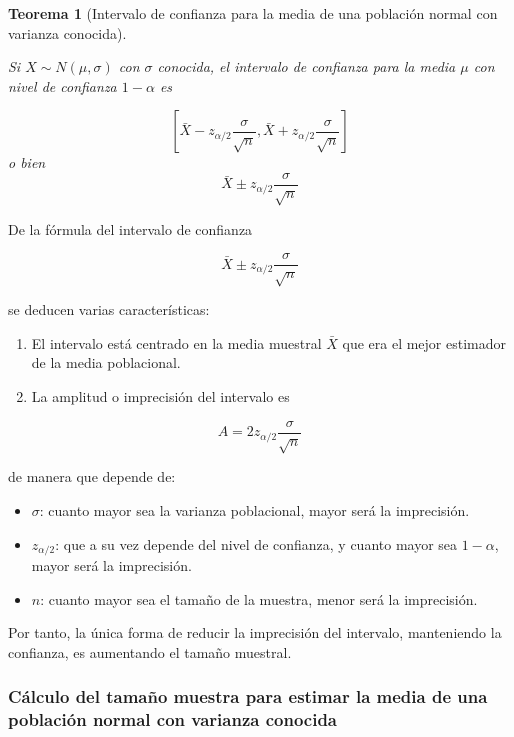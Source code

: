 \documentclass[
  a4paper,
]{scrreport}
\providecommand{\tightlist}{%
  \setlength{\itemsep}{0pt}\setlength{\parskip}{0pt}}\usepackage{longtable,booktabs,array}
\theoremstyle{plain}
\newtheorem{theorem}{Teorema}[chapter]
\theoremstyle{definition}
\theoremstyle{definition}
\theoremstyle{remark}
\begin{document}
\begin{theorem}[Intervalo de confianza para la media de una población
normal con varianza
conocida]\protect\hypertarget{thm-intervalo-confianza-media-normal-varianza-conocida}{}\label{thm-intervalo-confianza-media-normal-varianza-conocida}

Si \(X\sim N(\mu, \sigma)\) con \(\sigma\) conocida, el \emph{intervalo
de confianza para la media} \(\mu\) con nivel de confianza \(1-\alpha\)
es

\[
\left[\bar{X}-z_{\alpha/2}\frac{\sigma}{\sqrt{n}},\bar{X}+z_{\alpha/2}\frac{\sigma}{\sqrt{n}}\right]
\] o bien \[
\bar{X}\pm z_{\alpha/2}\frac{\sigma}{\sqrt{n}}
\]

\end{theorem}

De la fórmula del intervalo de confianza

\[
\bar{X}\pm z_{\alpha/2}\frac{\sigma}{\sqrt{n}}
\]

se deducen varias características:

\begin{enumerate}
\def\labelenumi{\alph{enumi}.}
\item
  El intervalo está centrado en la media muestral \(\bar X\) que era el
  mejor estimador de la media poblacional.
\item
  La amplitud o imprecisión del intervalo es
\end{enumerate}

\[
A= 2 z_{\alpha/2}\frac{\sigma}{\sqrt{n}}
\]

de manera que depende de:

\begin{itemize}
\tightlist
\item
  \(\sigma\): cuanto mayor sea la varianza poblacional, mayor será la
  imprecisión.
\item
  \(z_{\alpha/2}\): que a su vez depende del nivel de confianza, y
  cuanto mayor sea \(1-\alpha\), mayor será la imprecisión.
\item
  \(n\): cuanto mayor sea el tamaño de la muestra, menor será la
  imprecisión.
\end{itemize}

Por tanto, la única forma de reducir la imprecisión del intervalo,
manteniendo la confianza, es aumentando el tamaño muestral.

\hypertarget{cuxe1lculo-del-tamauxf1o-muestra-para-estimar-la-media-de-una-poblaciuxf3n-normal-con-varianza-conocida}{%
\subsubsection{Cálculo del tamaño muestra para estimar la media de una
población normal con varianza
conocida}\label{cuxe1lculo-del-tamauxf1o-muestra-para-estimar-la-media-de-una-poblaciuxf3n-normal-con-varianza-conocida}}
\end{document}
